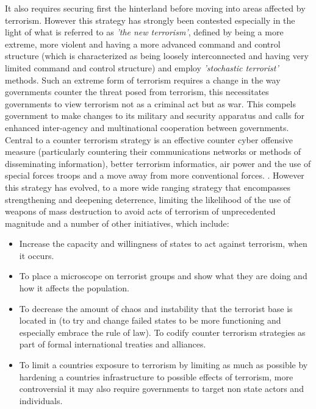 It also requires securing first the hinterland before moving into areas affected by terrorism. However this strategy has strongly been contested especially in the light of what is referred to as \textit{'the new terrorism'}, defined by being a more extreme, more violent and having a more advanced command and control structure (which is characterized as being loosely interconnected and having very limited command and control structure) and employ \textit{'stochastic terrorist'} methods. Such an extreme form of terrorism requires a change in the way governments counter the threat posed from terrorism, this necessitates governments to view terrorism not as a criminal act but as war. This compels government to make changes to its military and security apparatus and calls for enhanced inter-agency and multinational cooperation between governments. Central to a counter terrorism strategy is an effective counter cyber offensive measure (particularly countering their communications networks or methods of disseminating information), better terrorism informatics, air power and the use of special forces troops and a move away from more conventional forces. \citep{lesser1999countering}. However this strategy has evolved, \citep{lesser1999countering} to a more wide ranging strategy that encompasses strengthening and deepening deterrence, limiting the likelihood of the use of weapons of mass destruction to avoid acts of terrorism of unprecedented magnitude and a number of other initiatives, which include: 
\begin{itemize}
\item Increase the capacity and willingness of states to act against terrorism, when it occurs. 
\item To place a microscope on terrorist groups and show what they are doing and how it affects the population. 
\item To decrease the amount of chaos and instability that the terrorist base is located in (to try and change failed states to be more functioning and especially embrace the rule of law). To codify counter terrorism strategies as part of formal international treaties and alliances. 
\item To limit a countries exposure to terrorism by limiting as much as possible by hardening a countries infrastructure to possible effects of terrorism, more controversial it may also require governments to target non state actors and individuals.
\end{itemize}

